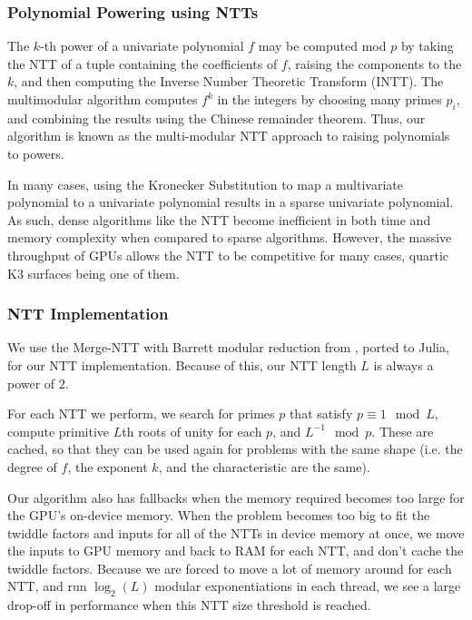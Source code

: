 \subsubsection{Polynomial Powering using NTTs}
The \(k\)-th power of a univariate polynomial \(f\)
may be computed mod \(p\) by taking the NTT 
of a tuple containing the coefficients of \(f\),
raising the components to the \(k\),
and then computing the Inverse Number Theoretic Transform (INTT).
The multimodular algorithm 
computes \(f^{k}\) in the integers by
choosing many primes \(p_{i}\), 
and combining the results using the Chinese remainder theorem.
Thus, our algorithm is known as the 
multi-modular NTT approach to raising polynomials to powers.

In many cases, using the Kronecker Substitution to 
map a multivariate polynomial to a univariate polynomial results in 
a sparse univariate polynomial. As such, dense 
algorithms like the NTT become inefficient in both 
time and memory complexity when compared to sparse algorithms.
However, the massive throughput of GPUs allows the 
NTT to be competitive for many cases, 
quartic K3 surfaces being one of them.

\subsubsection{NTT Implementation}

We use the Merge-NTT with Barrett modular reduction from \cite{ozcan-2023-fft}, 
ported to Julia, for our NTT implementation. 
Because of this, our NTT length $L$ is always a power of $2$. 

For each NTT we perform, we search for primes $p$ that satisfy 
$p \equiv 1 \mod L$, compute primitive $L$th roots of unity 
for each $p$, and $L^{-1} \mod p$. 
These are cached, so that they can be used again for problems with the same shape 
(i.e. the degree of \(f\), the exponent \(k\), and the characteristic are the same).

Our algorithm also has fallbacks when the memory required becomes too large for the 
GPU's on-device memory.
When the problem becomes too big to fit the twiddle factors and 
inputs for all of the NTTs in device memory at once, 
we move the inputs to GPU memory and 
back to RAM for each NTT, and don't cache the twiddle factors. 
Because we are forced to move a lot of memory around for each NTT, 
and run $\log_2(L)$ modular exponentiations in each thread,
we see a large drop-off in 
performance when this NTT size threshold is reached. 


